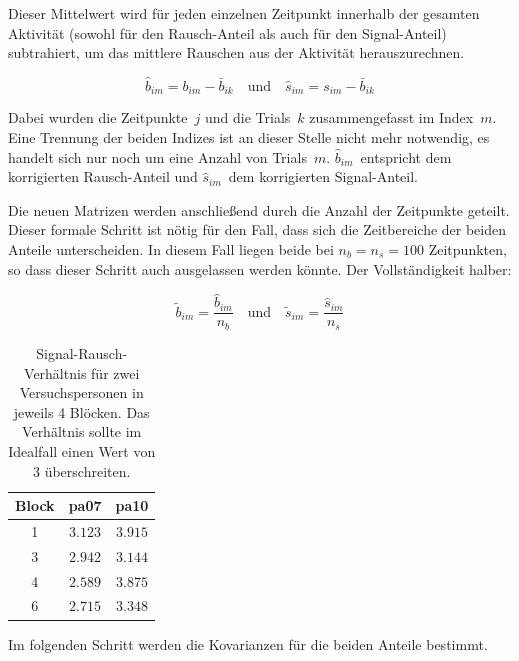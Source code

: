 \documentclass[doc,a4paper,12pt]{apa6}
\renewcommand{\arraystretch}{1.2}
\begin{document}
Dieser Mittelwert wird für jeden einzelnen Zeitpunkt innerhalb der gesamten Aktivität (sowohl für den Rausch-Anteil als auch für den Signal-Anteil) subtrahiert, um das mittlere Rauschen aus der Aktivität herauszurechnen.

\begin{equation}
\hat{b}_{im} = b_{im} - \bar{b}_{ik} \quad \text{und} \quad \hat{s}_{im} = s_{im} - \bar{b}_{ik}
\end{equation}

Dabei wurden die Zeitpunkte~$j$ und die Trials~$k$ zusammengefasst im Index~$m$. Eine Trennung der beiden Indizes ist an dieser Stelle nicht mehr notwendig, es handelt sich nur noch um eine Anzahl von Trials~$m$. $\hat{b}_{im}$~entspricht dem korrigierten Rausch-Anteil und $\hat{s}_{im}$~dem korrigierten Signal-Anteil.

Die neuen Matrizen werden anschließend durch die Anzahl der Zeitpunkte geteilt. Dieser formale Schritt ist nötig für den Fall, dass sich die Zeitbereiche der beiden Anteile unterscheiden. In diesem Fall liegen beide bei $n_b = n_s = 100$ Zeitpunkten, so dass dieser Schritt auch ausgelassen werden könnte. Der Vollständigkeit halber:

\begin{equation}
\tilde{b}_{im} = \frac{\hat{b}_{im}}{n_b} \quad \text{und} \quad \tilde{s}_{im} = \frac{\hat{s}_{im}}{n_s}
\end{equation}

\begin{table}[t]
  \caption{}
  \label{tab:snr}
  \vspace*{3mm}
  \centering
  \setlength{\tabcolsep}{1cm}
  \renewcommand{\arraystretch}{1.5}
  \begin{tabular}{ccc}
  \hline
  Block & pa07 & pa10 \\
  \hline
  1 & $3.123$ & $3.915$\\
  3 & $2.942$ & $3.144$\\
  4 & $2.589$ & $3.875$\\
  6 & $2.715$ & $3.348$\\
  \hline
  \end{tabular}
  \vspace*{3mm}
  \caption*{Signal-Rausch-Verhältnis für zwei Versuchspersonen in jeweils 4 Blöcken. Das Verhältnis sollte im Idealfall einen Wert von $3$ überschreiten.}
\end{table}

Im folgenden Schritt werden die Kovarianzen für die beiden Anteile bestimmt.
\end{document}
